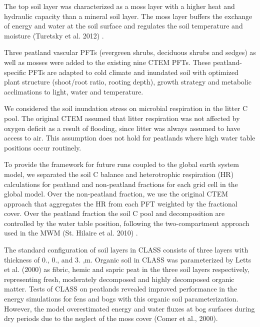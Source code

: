\begin{DoxyEnumerate}
\item The top soil layer was characterized as a moss layer with a higher heat and hydraulic capacity than a mineral soil layer. The moss layer buffers the exchange of energy and water at the soil surface and regulates the soil temperature and moisture (Turetsky et al. 2012) \cite{Turetsky2012-qh}.
\item Three peatland vascular P\+F\+Ts (evergreen shrubs, deciduous shrubs and sedges) as well as mosses were added to the existing nine C\+T\+E\+M P\+F\+Ts. These peatland-\/specific P\+F\+Ts are adapted to cold climate and inundated soil with optimized plant structure (shoot/root ratio, rooting depth), growth strategy and metabolic acclimations to light, water and temperature.
\item We considered the soil inundation stress on microbial respiration in the litter C pool. The original C\+T\+E\+M assumed that litter respiration was not affected by oxygen deficit as a result of flooding, since litter was always assumed to have access to air. This assumption does not hold for peatlands where high water table positions occur routinely.
\item To provide the framework for future runs coupled to the global earth system model, we separated the soil C balance and heterotrophic respiration (H\+R) calculations for peatland and non-\/peatland fractions for each grid cell in the global model. Over the non-\/peatland fraction, we use the original C\+T\+E\+M approach that aggregates the H\+R from each P\+F\+T weighted by the fractional cover. Over the peatland fraction the soil C pool and decomposition are controlled by the water table position, following the two-\/compartment approach used in the M\+W\+M (St. Hilaire et al. 2010) \cite{St-Hilaire2010-5e9}.

The standard configuration of soil layers in C\+L\+A\+S\+S consists of three layers with thickness of 0., 0., and 3. ,m. Organic soil in C\+L\+A\+S\+S was parameterized by Letts et al. (2000) \cite{Letts2000-pg} as fibric, hemic and sapric peat in the three soil layers respectively, representing fresh, moderately decomposed and highly decomposed organic matter. Tests of C\+L\+A\+S\+S on peatlands revealed improved performance in the energy simulations for fens and bogs with this organic soil parameterization. However, the model overestimated energy and water fluxes at bog surfaces during dry periods due to the neglect of the moss cover (Comer et al., 2000).


\end{DoxyEnumerate}
